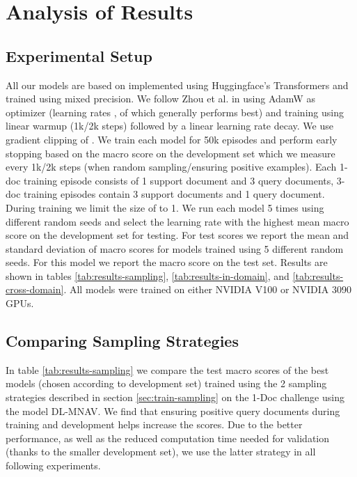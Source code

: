 \documentclass[11pt]{article}
\begin{document}
\section{Analysis of Results}
\label{sec:evaluation}
\subsection{Experimental Setup}
All our models are based on  \cite{devlin_bert_2019} implemented using Huggingface's Transformers \cite{wolf_transformers_2020} and trained using mixed precision. We follow Zhou et al. \cite{zhou_document-level_2020} in using AdamW \cite{loshchilov_decoupled_2019} as optimizer (learning rates , of which  generally performs best) and training using linear warmup (1k/2k steps) \cite{goyal_accurate_2017} followed by a linear learning rate decay. We use gradient clipping of . We train each model for 50k episodes and perform early stopping based on the macro  score on the development set which we measure every 1k/2k steps (when random sampling/ensuring positive examples). Each 1-doc training episode consists of 1 support document and 3 query documents, 3-doc training episodes contain 3 support documents and 1 query document. During training we limit the size of  to 1. We run each model 5 times using different random seeds and select the learning rate with the highest mean macro  score on the development set for testing. For test scores we report the mean and standard deviation of macro  scores for models trained using 5 different random seeds. For this model we report the macro  score on the test set. Results are shown in tables \ref{tab:results-sampling}, \ref{tab:results-in-domain}, and \ref{tab:results-cross-domain}.
All models were trained on either NVIDIA V100 or NVIDIA 3090 GPUs.

\subsection{Comparing Sampling Strategies}

In table \ref{tab:results-sampling} we compare the test macro  scores of the best models (chosen according to development set) trained using the 2 sampling strategies described in section \ref{sec:train-sampling} on the 1-Doc challenge using the model DL-MNAV. 
We find that ensuring positive query documents during training and development helps increase the  scores.
Due to the better performance, as well as the reduced computation time needed for validation (thanks to the smaller development set), we use the latter strategy in all following experiments.
\end{document}
